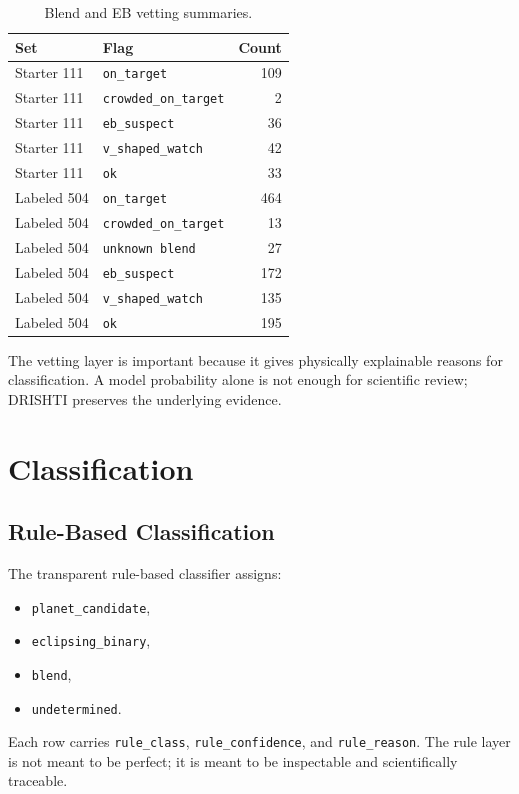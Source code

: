 \documentclass[11pt,a4paper]{article}
\newcommand{\code}[1]{\texttt{#1}}
\begin{document}
\begin{table}[H]
\centering
\caption{Blend and EB vetting summaries.}
\begin{tabular}{@{}llr@{}}
\toprule
Set & Flag & Count \\
\midrule
Starter 111 & \code{on_target} & 109 \\
Starter 111 & \code{crowded_on_target} & 2 \\
Starter 111 & \code{eb_suspect} & 36 \\
Starter 111 & \code{v_shaped_watch} & 42 \\
Starter 111 & \code{ok} & 33 \\
\midrule
Labeled 504 & \code{on_target} & 464 \\
Labeled 504 & \code{crowded_on_target} & 13 \\
Labeled 504 & \code{unknown blend} & 27 \\
Labeled 504 & \code{eb_suspect} & 172 \\
Labeled 504 & \code{v_shaped_watch} & 135 \\
Labeled 504 & \code{ok} & 195 \\
\bottomrule
\end{tabular}
\end{table}

The vetting layer is important because it gives physically explainable reasons for classification. A model probability alone is not enough for scientific review; DRISHTI preserves the underlying evidence.

\section{Classification}

\subsection{Rule-Based Classification}

The transparent rule-based classifier assigns:

\begin{itemize}
  \item \code{planet_candidate},
  \item \code{eclipsing_binary},
  \item \code{blend},
  \item \code{undetermined}.
\end{itemize}

Each row carries \code{rule_class}, \code{rule_confidence}, and \code{rule_reason}. The rule layer is not meant to be perfect; it is meant to be inspectable and scientifically traceable.
\end{document}
